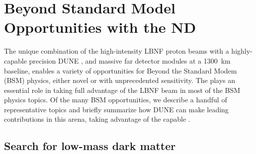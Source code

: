 \chapter{Beyond Standard Model Opportunities with the ND}

\label{ch:appx-ndbsm:BSMappendix}

The unique combination of the high-intensity LBNF proton beams with a highly-capable precision DUNE , and massive  far detector modules at a 1300~km baseline, enables a variety of opportunities for Beyond the Standard Modem (BSM) physics, either novel or with unprecedented sensitivity. The  plays an essential role in taking full advantage of the LBNF beam in most of the BSM physics topics.  Of the many BSM opportunities, we describe a handful of representative topics and briefly summarize how DUNE can make leading contributions in this arena, taking advantage of the capable . 

\section{Search for low-mass dark matter}
\label{ssec:exsum-nd-BSMappendix-dm}


